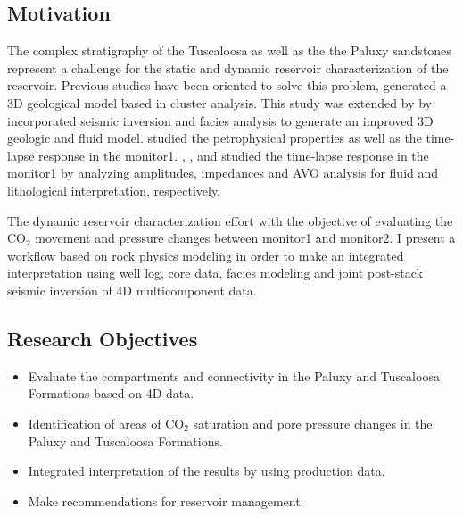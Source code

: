 
\newpage
\subsection{Motivation}

The complex stratigraphy of the Tuscaloosa as well as the the Paluxy
sandstones represent a challenge for the  static and dynamic reservoir 
characterization of the reservoir. Previous studies have been oriented
to solve this problem, \citep{ref:nick} generated a 3D geological model
based in cluster analysis. This study was extended by \citep{ref:doug} by 
incorporated seismic inversion and facies analysis to generate an improved
3D geologic and fluid model. \citep{ref:assem} studied the petrophysical properties
as well as the time-lapse response in the monitor1. \citep{ref:holly},
\citep{ref:julio}, and \citep{ref:ishan} studied the time-lapse response in the monitor1
by analyzing amplitudes, impedances and AVO analysis for fluid and lithological 
interpretation, respectively.

The dynamic reservoir characterization effort with 
the objective of evaluating the CO$_2$ movement and pressure changes between 
monitor1 and monitor2. I present a workflow based on rock physics modeling 
in order to make an integrated interpretation using well log, core data, 
facies modeling and joint post-stack seismic inversion of 4D multicomponent
data.

\subsection{Research Objectives}

\begin{itemize}
\item Evaluate the compartments and connectivity in the Paluxy and Tuscaloosa 
      Formations based on 4D data.  
\item Identification of areas of CO$_2$ saturation and pore pressure
      changes in the Paluxy and Tuscaloosa Formations. 
\item Integrated interpretation of the results by using production data. 
\item Make recommendations for reservoir management.
\end{itemize}


\clearpage


   
   
